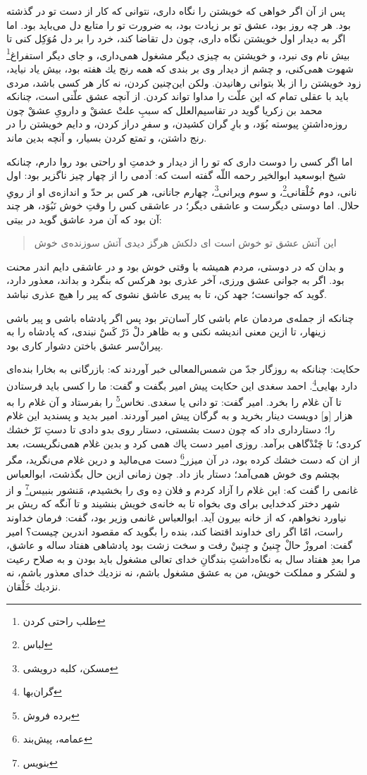 پس از آن اگر خواهى كه خويشتن را نگاه دارى، نتوانى كه كار از دست تو در  گذشته بود. هر چه روز بود، عشق تو بر زيادت بود، به ضرورت تو را متابع دل مى‌بايد بود. اما اگر به ديدار اول خويشتن نگاه دارى، چون دل تقاضا كند، خرد را بر دل مُوَكِل كنى تا بيش نام وى نبرد، و خويشتن به چيزى ديگر مشغول همى‌دارى، و جاى ديگر استفراغ\footnote{طلب راحتی کردن}  شهوت همى‌كنى، و چشم از ديدار وى بر بندى كه همه رنج يك هفته بود، بيش ياد نيايد، زود خويشتن را از بلا بتوانى رهانيدن. ولكن اين‌چنين كردن، نه كار هر كسى باشد، مردى بايد با عقلى تمام كه اين علّت را مداوا تواند كردن. از آنچه عشق علّتى است، چنانكه محمد بن زكريا گويد در تقاسيم‌العلل كه سببِ علتْ عشقْ و داروىِ عشقْ چون روزه‌داشتنِ پيوسته بُوَد، و بارِ گران كشيدن، و سفرِ دراز كردن، و دايم خويشتن را در رنج داشتن، و تمتع كردن بسيار، و آنچه بدين ماند.

اما اگر كسى را دوست دارى كه تو را از ديدار و خدمتِ او راحتى بود روا دارم، چنانكه شيخ ابوسعيد ابو‌الخير رحمه اللّه گفته است كه: آدمى را از چهار چيز ناگزير بود: اول نانى، دوم خُلْقانى\footnote{لباس}، و سوم ويرانى\footnote{مسکن، کلبه درویشی}، چهارم جانانى، هر كس بر حدّ و اندازه‌ی او از رویِ حلال. اما دوستى ديگرست و عاشقى ديگر؛ در عاشقى كس را وقتِ خوش نَبُوَد، هر چند آن بود كه آن مرد عاشق گويد در بيتى:
 
\begin{quote}
\centering
اين آتش عشق تو خوش است اى دلكش \quad \quad هرگز ديدى آتش سوزنده‌ی خوش
\end{quote}

و بدان كه در دوستى، مردم هميشه با وقتى خوش بود و در عاشقى دايم اندر محنت بود. اگر به جوانى عشق‌ ورزى، آخر عذرى بود هركس كه بنگرد و بداند، معذور دارد، گويد كه جوانست؛ جهد كن، تا به پيرى عاشق نشوى كه پير را هيچ عذرى نباشد.

چنانكه از جمله‌ی مردمان عام باشى كار آسان‌تر بود پس اگر پادشاه باشى و پير باشى زينهار، تا ازين معنى انديشه نكنى و به ظاهر دلْ دَرْ کَسْ نبندى، كه پادشاه را به پيران‌ْسر عشق باختن دشوار كارى بود.

حكايت: چنانكه به روزگار جدّ من شمس‌المعالى خبر آوردند كه: بازرگانى به بخارا بنده‌اى دارد بهايى\footnote{گران‌بها}. احمد سغدى اين حكايت پيش امير بگفت و گفت: ما را كسى بايد فرستادن تا آن غلام را بخرد. امير گفت: تو دانى يا سغدى. نخاس\footnote{برده فروش} را بفرستاد و آن غلام را به هزار [و] دويست دينار بخريد و به گرگان پيش امير آوردند. امير بديد و پسنديد اين غلام را؛ دستاردارى داد كه چون دست بشستى، دستار روى بدو دادى تا دستِ تَرْ خشك كردى؛ تا چَنْد‌ْگاهى برآمد. روزى امير دست پاك همى كرد و بدين غلام همى‌نگريست، بعد از ان كه دست خشك كرده بود، در آن ميزر\footnote{عمامه، پیش‌بند} دست مى‌ماليد و درين غلام مى‌نگريد، مگر بچشم وى خوش همى‌آمد؛ دستار باز داد. چون زمانى ازين حال بگذشت، ابوالعباس غانمى را گفت كه: اين غلام را آزاد كردم و فلان دِه وى را بخشيدم، مَنشور بنبيس\footnote{بنویس} و از شهر دختر كدخدايى براى وى بخواه تا به خانه‌ی خويش بنشيند و تا آنگه كه ريش بر نياورد نخواهم، كه از خانه بيرون آيد. ابوالعباس غانمى وزير بود، گفت: فرمان خداوند راست، امّا اگر راى خداوند اقتضا كند، بنده را بگويد كه مقصود اندرين چيست‌؟ امير گفت: امروزْ حالْ چِنينُ و چِنينْ رفت و سخت زشت بود پادشاهى هفتاد ساله و عاشق، مرا بعدِ هفتاد سال به نگاه‌داشتِ بندگانِ خداى تعالى مشغول بايد بودن و به صلاح رعيت و لشكر و مملكت خويش، من به عشق مشغول باشم، نه نزديك خداى معذور باشم، نه نزديك خَلْقان.

